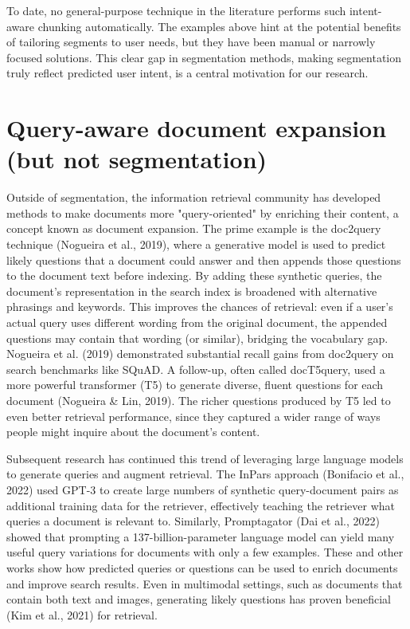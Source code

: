 \documentclass[12pt,a4paper]{report}
\begin{document}
To date, no general-purpose technique in the literature performs such intent-aware chunking automatically. The examples above hint at the potential benefits of tailoring segments to user needs, but they have been manual or narrowly focused solutions. This clear gap in segmentation methods, making segmentation truly reflect predicted user intent, is a central motivation for our research.

\section{Query-aware document expansion (but not segmentation)}

Outside of segmentation, the information retrieval community has developed methods to make documents more "query-oriented" by enriching their content, a concept known as document expansion. The prime example is the doc2query technique (Nogueira et al., 2019), where a generative model is used to predict likely questions that a document could answer and then appends those questions to the document text before indexing. By adding these synthetic queries, the document's representation in the search index is broadened with alternative phrasings and keywords. This improves the chances of retrieval: even if a user's actual query uses different wording from the original document, the appended questions may contain that wording (or similar), bridging the vocabulary gap. Nogueira et al. (2019) demonstrated substantial recall gains from doc2query on search benchmarks like SQuAD. A follow-up, often called docT5query, used a more powerful transformer (T5) to generate diverse, fluent questions for each document (Nogueira \& Lin, 2019). The richer questions produced by T5 led to even better retrieval performance, since they captured a wider range of ways people might inquire about the document's content.

Subsequent research has continued this trend of leveraging large language models to generate queries and augment retrieval. The InPars approach (Bonifacio et al., 2022) used GPT-3 to create large numbers of synthetic query-document pairs as additional training data for the retriever, effectively teaching the retriever what queries a document is relevant to. Similarly, Promptagator (Dai et al., 2022) showed that prompting a 137-billion-parameter language model can yield many useful query variations for documents with only a few examples. These and other works show how predicted queries or questions can be used to enrich documents and improve search results. Even in multimodal settings, such as documents that contain both text and images, generating likely questions has proven beneficial (Kim et al., 2021) for retrieval.
\end{document}
